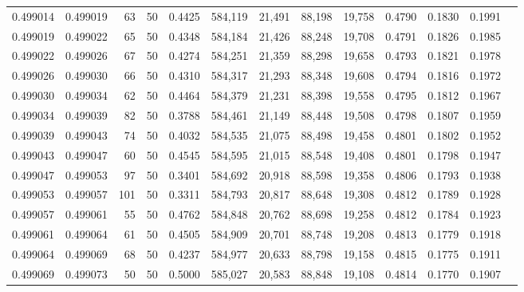 \begin{tabular}{rrrrrrrrrrrrr}
0.499014 & 0.499019 &    63 &  50 &                                     0.4425 & 584,119 &  21,491 &  88,198 &  19,758 & 0.4790 & 0.1830 & 0.1991 \\
0.499019 & 0.499022 &    65 &  50 &                                     0.4348 & 584,184 &  21,426 &  88,248 &  19,708 & 0.4791 & 0.1826 & 0.1985 \\
0.499022 & 0.499026 &    67 &  50 &                                     0.4274 & 584,251 &  21,359 &  88,298 &  19,658 & 0.4793 & 0.1821 & 0.1978 \\
0.499026 & 0.499030 &    66 &  50 &                                     0.4310 & 584,317 &  21,293 &  88,348 &  19,608 & 0.4794 & 0.1816 & 0.1972 \\
0.499030 & 0.499034 &    62 &  50 &                                     0.4464 & 584,379 &  21,231 &  88,398 &  19,558 & 0.4795 & 0.1812 & 0.1967 \\
0.499034 & 0.499039 &    82 &  50 &                                     0.3788 & 584,461 &  21,149 &  88,448 &  19,508 & 0.4798 & 0.1807 & 0.1959 \\
0.499039 & 0.499043 &    74 &  50 &                                     0.4032 & 584,535 &  21,075 &  88,498 &  19,458 & 0.4801 & 0.1802 & 0.1952 \\
0.499043 & 0.499047 &    60 &  50 &                                     0.4545 & 584,595 &  21,015 &  88,548 &  19,408 & 0.4801 & 0.1798 & 0.1947 \\
0.499047 & 0.499053 &    97 &  50 &                                     0.3401 & 584,692 &  20,918 &  88,598 &  19,358 & 0.4806 & 0.1793 & 0.1938 \\
0.499053 & 0.499057 &   101 &  50 &                                     0.3311 & 584,793 &  20,817 &  88,648 &  19,308 & 0.4812 & 0.1789 & 0.1928 \\
0.499057 & 0.499061 &    55 &  50 &                                     0.4762 & 584,848 &  20,762 &  88,698 &  19,258 & 0.4812 & 0.1784 & 0.1923 \\
0.499061 & 0.499064 &    61 &  50 &                                     0.4505 & 584,909 &  20,701 &  88,748 &  19,208 & 0.4813 & 0.1779 & 0.1918 \\
0.499064 & 0.499069 &    68 &  50 &                                     0.4237 & 584,977 &  20,633 &  88,798 &  19,158 & 0.4815 & 0.1775 & 0.1911 \\
0.499069 & 0.499073 &    50 &  50 &                                     0.5000 & 585,027 &  20,583 &  88,848 &  19,108 & 0.4814 & 0.1770 & 0.1907 \\

\end{tabular}
